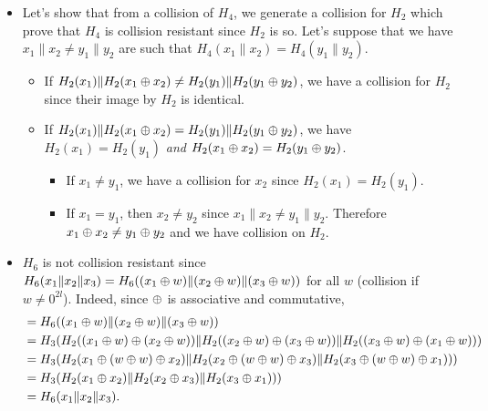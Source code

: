 \begin{solution}
  \begin{itemize}
    \item
      Let's show that from a collision of $H_4$, we generate a collision for $H_2$
      which prove that $H_4$ is collision resistant since $H_2$ is so.
      Let's suppose that we have $x_1\|x_2 \neq y_1\|y_2$ are such that $H_4(x_1\|x_2) = H_4(y_1\|y_2)$.
      \begin{itemize}
        \item
          If $H_2(x_1) \| H_2(x_1 \oplus x_2) \neq H_2(y_1) \| H_2(y_1 \oplus y_2)$,
          we have a collision for $H_2$ since their image by $H_2$ is identical.
        \item
          If $H_2(x_1) \| H_2(x_1 \oplus x_2) = H_2(y_1) \| H_2(y_1 \oplus y_2)$,
          we have $H_2(x_1) = H_2(y_1)$ \emph{and} $H_2(x_1 \oplus x_2) = H_2(y_1 \oplus y_2)$.
          \begin{itemize}
            \item If $x_1 \neq y_1$, we have a collision for $x_2$ since $H_2(x_1) = H_2(y_1)$.
            \item If $x_1 = y_1$, then $x_2 \neq y_2$ since $x_1\|x_2 \neq y_1\|y_2$.
              Therefore $x_1 \oplus x_2 \neq y_1 \oplus y_2$ and we have collision on $H_2$.
          \end{itemize}
      \end{itemize}
    \item
      $H_6$ is not collision resistant since $H_6(x_1\|x_2\|x_3) = H_6((x_1 \oplus w)\|(x_2 \oplus w)\|(x_3 \oplus w))$
      for all $w$ (collision if $w\neq 0^{2l}$). 
      Indeed, since $\oplus$ is associative and commutative,
      \begin{align*}
        & = H_6((x_1 \oplus w)\|(x_2 \oplus w)\|(x_3 \oplus w))\\
        & = H_3(H_2((x_1 \oplus w) \oplus (x_2 \oplus w))\|H_2((x_2 \oplus w) \oplus (x_3 \oplus w))\|H_2((x_3 \oplus w) \oplus (x_1 \oplus w)))\\
        & = H_3(H_2(x_1 \oplus (w \oplus w) \oplus x_2)\|H_2(x_2 \oplus (w \oplus w) \oplus x_3)\|H_2(x_3 \oplus (w \oplus w) \oplus x_1)))\\
        & = H_3(H_2(x_1 \oplus x_2)\|H_2(x_2 \oplus x_3)\|H_2(x_3 \oplus x_1)))\\
        & = H_6(x_1\|x_2\|x_3).
      \end{align*}
  \end{itemize}
\end{solution}


